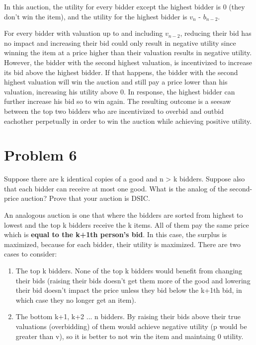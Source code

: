 \documentclass{article}
\begin{document}
In this auction, the utility for every bidder except the highest bidder is 0
(they don't win the item), and the utility for the highest bidder is $v_n$ -
$b_{n-2}$.

For every bidder with valuation up to and including $v_{n-2}$, reducing their
bid has no impact and increasing their bid could only result in negative
utility since winning the item at a price higher than their valuation results
in negative utility. However, the bidder with the second highest valuation,
is incentivized to increase its bid above the highest bidder. If that
happens, the bidder with the second highest valuation will win the auction and
still pay a price lower than his valuation, increasing his utility above 0. In
response, the highest bidder can further increase his bid so to win again.
The resulting outcome is a seesaw between the top two bidders who are
incentivized to overbid and outbid eachother perpetually in order to win the
auction while achieving positive utility.

\section*{Problem 6}

Suppose there are k identical copies of a good and n > k bidders. Suppose also that each bidder can receive
at most one good. What is the analog of the second-price auction? Prove that your auction is DSIC.

An analogous auction is one that where the bidders are sorted from highest to
lowest and the top k bidders receive the k items.  All of them pay the same
price which is \textbf{equal to the k+1th person's bid}. In this case, the surplus is
maximized, because for each bidder, their utility is maximized. There are two
cases to consider:
\begin{enumerate} 
\item The top k bidders. None of the top k bidders would benefit from changing their bids (raising their bids
doesn't get them more of the good and lowering their bid doesn't impact
the price unless they bid below the k+1th bid, in which case they no longer
get an item). 
\item The bottom k+1, k+2 ... n bidders.  By raising their bids above their
	true valuations (overbidding) of them would achieve negative utility (p
		would be greater than v), so it is better to not win the item and
		maintaing 0 utility.
		
\end{enumerate}
\end{document}
